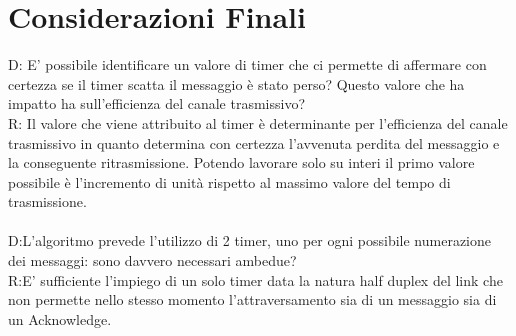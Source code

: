 \documentclass{article}
\begin{document}
\section{Considerazioni Finali}
D: E' possibile identificare un valore di timer che ci permette di affermare con certezza se il timer scatta il messaggio è stato perso? Questo valore che ha impatto ha sull'efficienza del canale trasmissivo?
\\R: Il valore che viene attribuito al timer è determinante per l'efficienza del canale trasmissivo in quanto determina con certezza l'avvenuta perdita del messaggio e la conseguente ritrasmissione. Potendo lavorare solo su interi il primo valore possibile è l'incremento di unità rispetto al massimo valore del tempo di trasmissione.
\\\\
D:L'algoritmo prevede l'utilizzo di 2 timer, uno per ogni possibile numerazione dei messaggi: sono davvero necessari ambedue?
\\R:E' sufficiente l'impiego di un solo timer data la natura half duplex del link che non permette nello stesso momento l'attraversamento sia di un messaggio sia di un Acknowledge.
\end{document}
